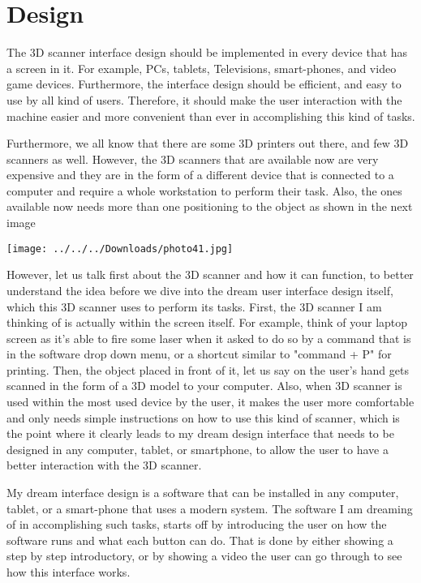 \documentclass[12pt, oneside]{amsart}   	%
\begin{document}
\section{Design}
The 3D scanner interface design should be implemented in every device that has a screen in it.  For example, PCs, tablets, Televisions, smart-phones, and video game devices. Furthermore, the interface design should be efficient, and easy to use by all kind of users. Therefore, it should make the user interaction with the machine easier and more convenient than ever in accomplishing this kind of tasks. 

Furthermore, we all know that there are some 3D printers out there, and few 3D scanners as well.  However, the 3D scanners that are available now are very expensive and they are in the form of a different device that is connected to a computer and require a whole workstation to perform their task.  Also, the ones available now needs more than one positioning to the object as shown in the next image

\texttt{[image: ../../../Downloads/photo41.jpg]}


However, let us talk first about the 3D scanner and how it can function, to better understand the idea before we dive into the dream user interface design itself, which this 3D scanner uses to perform its tasks.
First, the 3D scanner I am thinking of is actually within the screen itself.  For example, think of your laptop screen as it's able to fire some laser when it asked to do so by a command that is in the software drop down menu, or a shortcut similar to "command + P" for printing. Then, the object placed in front of it, let us say on the user's hand gets scanned in the form of a 3D model to your computer.  Also, when 3D scanner is used within the most used device by the user, it makes the user more comfortable and only needs simple instructions on how to use this kind of scanner, which is the point where it clearly leads to my dream design interface that needs to be designed in any computer, tablet, or smartphone, to allow the user to have a better interaction with the 3D scanner.

My dream interface design is a software that can be installed in any computer, tablet, or a smart-phone that uses a modern system.  The software I am dreaming of in accomplishing such tasks, starts off by introducing the user on how the software runs and what each button can do.  That is done by either showing a step by step introductory, or by showing a video the user can go through to see how this interface works.  
\end{document}
